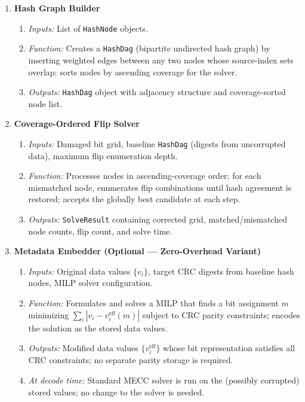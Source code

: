 \begin{enumerate}
        \item \textbf{Hash Graph Builder}
            \begin{enumerate}
                \item \textit{Inputs:} List of \texttt{HashNode} objects.
                \item \textit{Function:} Creates a \texttt{HashDag} (bipartite undirected hash graph) by inserting weighted edges between any two nodes whose source-index sets overlap; sorts nodes by ascending coverage for the solver.
                \item \textit{Outputs:} \texttt{HashDag} object with adjacency structure and coverage-sorted node list.
            \end{enumerate}

        \item \textbf{Coverage-Ordered Flip Solver}
            \begin{enumerate}
                \item \textit{Inputs:} Damaged bit grid, baseline \texttt{HashDag} (digests from uncorrupted data), maximum flip enumeration depth.
                \item \textit{Function:} Processes nodes in ascending-coverage order; for each mismatched node, enumerates flip combinations until hash agreement is restored; accepts the globally best candidate at each step.
                \item \textit{Outputs:} \texttt{SolveResult} containing corrected grid, matched/mismatched node counts, flip count, and solve time.
            \end{enumerate}

        \item \textbf{Metadata Embedder (Optional --- Zero-Overhead Variant)}
            \begin{enumerate}
                \item \textit{Inputs:} Original data values $\{v_i\}$, target CRC digests from baseline hash nodes, MILP solver configuration.
                \item \textit{Function:} Formulates and solves a MILP that finds a bit assignment $m$ minimizing $\sum_i |v_i - v_i^{\text{eff}}(m)|$ subject to CRC parity constraints; encodes the solution as the stored data values.
                \item \textit{Outputs:} Modified data values $\{v_i^{\text{eff}}\}$ whose bit representation satisfies all CRC constraints; no separate parity storage is required.
                \item \textit{At decode time:} Standard MECC solver is run on the (possibly corrupted) stored values; no change to the solver is needed.
            \end{enumerate}

    \end{enumerate}

